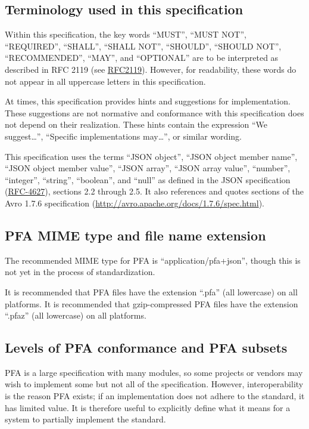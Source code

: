 \documentclass{article}
\theoremstyle{definition}
\begin{document}
\subsection{Terminology used in this specification}

Within this specification, the key words ``MUST'', ``MUST NOT'', ``REQUIRED'', ``SHALL'', ``SHALL NOT'', ``SHOULD'', ``SHOULD NOT'', ``RECOMMENDED'', ``MAY'', and ``OPTIONAL'' are to be interpreted as described in RFC 2119 (see \href{http://www.ietf.org/rfc/rfc2119.txt}{RFC2119}).  However, for readability, these words do not appear in all uppercase letters in this specification.

At times, this specification provides hints and suggestions for implementation.  These suggestions are not normative and conformance with this specification does not depend on their realization.  These hints contain the expression ``We suggest\ldots'', ``Specific implementations may\ldots'', or similar wording.

This specification uses the terms ``JSON object'', ``JSON object member name'', ``JSON object member value'', ``JSON array'', ``JSON array value'', ``number'', ``integer'', ``string'', ``boolean'', and ``null'' as defined in the JSON specification (\href{http://tools.ietf.org/html/rfc4627}{RFC-4627}), sections 2.2 through 2.5.  It also references and quotes sections of the Avro 1.7.6 specification (\url{http://avro.apache.org/docs/1.7.6/spec.html}).

\subsection{PFA MIME type and file name extension}

The recommended MIME type for PFA is ``application/pfa+json'', though this is not yet in the process of standardization.

It is recommended that PFA files have the extension ``.pfa'' (all lowercase) on all platforms.  It is recommended that gzip-compressed PFA files have the extension ``.pfaz'' (all lowercase) on all platforms.

\hypertarget{hsec:conformance}{}
\subsection{Levels of PFA conformance and PFA subsets}
\label{sec:conformance}

PFA is a large specification with many modules, so some projects or vendors may wish to implement some but not all of the specification.  However, interoperability is the reason PFA exists; if an implementation does not adhere to the standard, it has limited value.  It is therefore useful to explicitly define what it means for a system to partially implement the standard.
\end{document}

